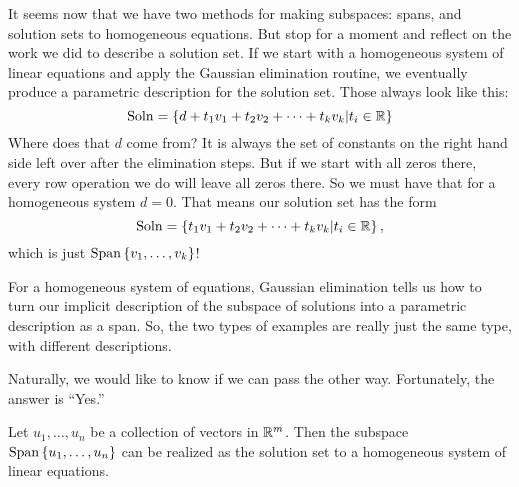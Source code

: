 \documentclass[00-livre-main.tex]{subfiles}
\begin{document}
It seems now that we have two methods for making subspaces: spans, and solution sets to homogeneous equations. But stop for a moment and reflect on the work we did to describe a solution set. If we start with a homogeneous system of linear equations and apply the Gaussian elimination routine, we eventually produce a parametric description for the solution set. Those always look like this:
\[
\mathrm{Soln} = \left\{ d + t_1 v_1 + t_2 v_2 + \dots + t_k v_k \middle| t_i \in \mathbb{R} \right\}
\]
Where does that $d$ come from? It is always the set of constants on the right hand side left over after the elimination steps. But if we start with all zeros there, every row operation we do will leave all zeros there. So we must have that for a homogeneous system $d=0$. That means our solution set has the form
\[
\mathrm{Soln} = \left\{ t_1 v_1 + t_2 v_2 + \dots + t_k v_k \middle| t_i \in \mathbb{R} \right\},
\]
which is just $\mathrm{Span}\left\{ v_1,\ldots,v_k \right\}$!

For a homogeneous system of equations, Gaussian elimination tells us how to turn our implicit description of the subspace of solutions into a parametric description as a span. So, the two types of examples are really just the same type, with different descriptions.

Naturally, we would like to know if we can pass the other way. Fortunately, the answer is ``Yes.''

\begin{theorem}
Let $u_1, \ldots, u_n$ be a collection of vectors in $\mathbb{R}^m$. Then the subspace $\mathrm{Span}\left\{ u_1,\ldots,u_n \right\}$ can be realized as the solution set to a homogeneous system of linear equations.
\end{theorem}
\end{document}
